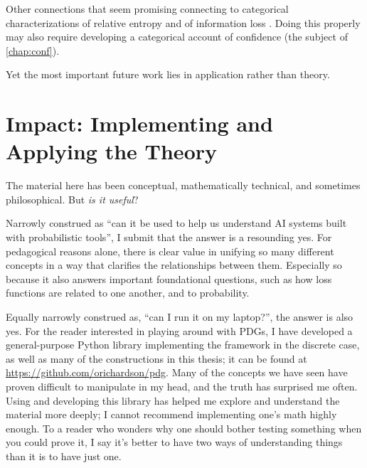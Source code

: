 Other connections that seem promising connecting to categorical characterizations of relative entropy \citep{baez2014bayesiancharacterizationrelativeentropy} 
and of information loss \citep[Theorem 12.4.9]{leinster2021entropy}.
Doing this properly may also require developing a categorical account of confidence (the subject of \cref{chap:conf}). 

Yet the most important future work lies in application rather than theory.

\section{Impact: Implementing and Applying the Theory}

The material here has been conceptual, mathematically technical, and sometimes philosophical.
But \emph{is it useful}?

Narrowly construed as ``can it be used to help us understand AI systems built with probabilistic tools'', I submit that the answer is a resounding yes. 
For pedagogical reasons alone, there is clear value in unifying so many different concepts in a way that clarifies the relationships between them.
Especially so because it also answers important foundational questions, such as how loss functions are related to one another, and to probability.

Equally narrowly construed as, ``can I run it on my laptop?'', the answer is also yes. 
For the reader interested in playing around with PDGs, I have developed a general-purpose Python library implementing the framework in the discrete case, as well as many of the constructions in this thesis;
it can be found at \url{https://github.com/orichardson/pdg}.
%
Many of the concepts we have seen have proven difficult to manipulate in my head, and the truth has surprised me often.
Using and developing this library has helped me explore and understand the material more deeply; I cannot recommend implementing one's math highly enough. 
To a reader who wonders why one should bother testing something when you could prove it, I say it's better to have two ways of understanding things than it is to have just one. 

%


